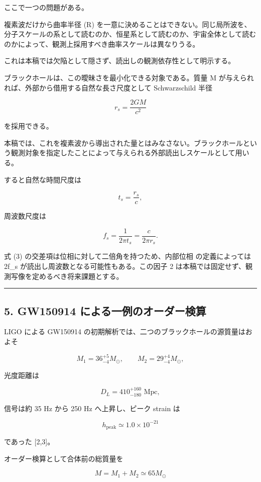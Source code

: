 \documentclass[
  a4paper,
]{ltjsarticle}
\begin{document}
ここで一つの問題がある。

複素波だけから曲率半径 (R)
を一意に決めることはできない。同じ局所波を、分子スケールの系として読むのか、恒星系として読むのか、宇宙全体として読むのかによって、観測上採用すべき曲率スケールは異なりうる。

これは本稿では欠陥として隠さず、読出しの観測依存性として明示する。

ブラックホールは、この曖昧さを最小化できる対象である。質量 M
が与えられれば、外部から借用する自然な長さ尺度として Schwarzschild 半径

\[r_s=\frac{2GM}{c^2} \tag{9}\]

を採用できる。

本稿では、これを複素波から導出された量とはみなさない。ブラックホールという観測対象を指定したことによって与えられる外部読出しスケールとして用いる。

すると自然な時間尺度は

\[t_s=\frac{r_s}{c},\]

周波数尺度は

\[f_s=\frac{1}{2\pi t_s} = \frac{c}{2\pi r_s}. \tag{10}\]

式 (3) の交差項は位相に対して二倍角を持つため、内部位相 \theta
の定義によっては 2f\_s が読出し周波数となる可能性もある。この因子 2
は本稿では固定せず、観測写像を定めるべき将来課題とする。

\begin{center}\rule{0.5\linewidth}{0.5pt}\end{center}

\subsection{5. GW150914
による一例のオーダー検算}\label{gw150914-ux306bux3088ux308bux4e00ux4f8bux306eux30aaux30fcux30c0ux30fcux691cux7b97}

LIGO による GW150914
の初期解析では、二つのブラックホールの源質量はおよそ

\[M_1=36_{-4}^{+5}M_\odot,\qquad M_2=29_{-4}^{+4}M_\odot,\]

光度距離は

\[D_L=410_{-180}^{+160} \text{ Mpc},\]

信号は約 35 Hz から 250 Hz へ上昇し、ピーク strain は

\[h_\text{peak}\simeq1.0\times10^{-21}\]

であった {[}2,3{]}。

オーダー検算として合体前の総質量を

\[M=M_1+M_2\simeq65M_\odot\]
\end{document}
